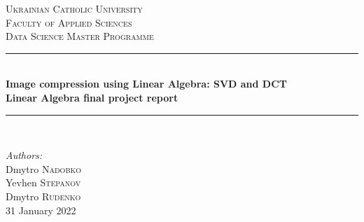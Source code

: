 \begin{titlepage}

\newcommand{\HRule}{\rule{\linewidth}{0.5mm}} %

\center %
 

\textsc{\LARGE Ukrainian Catholic University}\\[1cm] %
\textsc{\Large  Faculty of Applied Sciences}\\[0.5cm] %
\textsc{\large Data Science Master Programme}\\[0.5cm] %
\vspace*{1cm}

\HRule \\[0.4cm]
{ \huge \bfseries Image compression using Linear Algebra: SVD and DCT}\\[10pt]
{\Large \bfseries Linear Algebra final project report}\\[0.4cm] %
\HRule \\[1cm]
 
\vspace*{1cm}

\Large \emph{Authors:}\\
Dmytro \textsc{Nadobko}\\ Yevhen \textsc{Stepanov}\\ Dmytro \textsc{Rudenko}\\ [1cm] %

\vspace*{1cm}
{\large 31 January 2022}\\[2cm] %


\end{titlepage}

